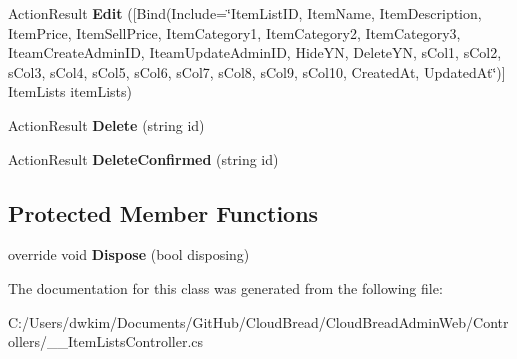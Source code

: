\begin{DoxyCompactItemize}
\item 
Action\+Result {\bfseries Edit} (\mbox{[}Bind(Include=\char`\"{}Item\+List\+ID, Item\+Name, Item\+Description, Item\+Price, Item\+Sell\+Price, Item\+Category1, Item\+Category2, Item\+Category3, Iteam\+Create\+Admin\+ID, Iteam\+Update\+Admin\+ID, Hide\+YN, Delete\+YN, s\+Col1, s\+Col2, s\+Col3, s\+Col4, s\+Col5, s\+Col6, s\+Col7, s\+Col8, s\+Col9, s\+Col10, Created\+At, Updated\+At\char`\"{})\mbox{]} Item\+Lists item\+Lists)\hypertarget{a00006_a20b5c0d6b9166864257fb5f3b4e922d0}{}\label{a00006_a20b5c0d6b9166864257fb5f3b4e922d0}

\item 
Action\+Result {\bfseries Delete} (string id)\hypertarget{a00006_af41216167b50e9a12a558729ee146437}{}\label{a00006_af41216167b50e9a12a558729ee146437}

\item 
Action\+Result {\bfseries Delete\+Confirmed} (string id)\hypertarget{a00006_ab75187ceb86a806c6faa82a8a4b0d0a9}{}\label{a00006_ab75187ceb86a806c6faa82a8a4b0d0a9}

\end{DoxyCompactItemize}
\subsection*{Protected Member Functions}
\begin{DoxyCompactItemize}
\item 
override void {\bfseries Dispose} (bool disposing)\hypertarget{a00006_a8a9022d9c6ddc4f49cca9218cdc52633}{}\label{a00006_a8a9022d9c6ddc4f49cca9218cdc52633}

\end{DoxyCompactItemize}


The documentation for this class was generated from the following file\+:\begin{DoxyCompactItemize}
\item 
C\+:/\+Users/dwkim/\+Documents/\+Git\+Hub/\+Cloud\+Bread/\+Cloud\+Bread\+Admin\+Web/\+Controllers/\+\_\+\+\_\+\+Item\+Lists\+Controller.\+cs\end{DoxyCompactItemize}
